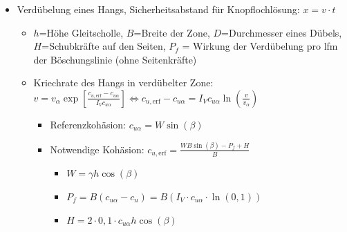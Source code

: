 \documentclass[fleqn,twoside]{article}
\begin{document}
\begin{itemize}
	\item Verdübelung eines Hangs, Sicherheitsabstand für Knopflochlösung: $x=v\cdot t$
	\begin{itemize}
		\item $h$=Höhe Gleitscholle, $B$=Breite der Zone, $D$=Durchmesser eines Dübels, $H$=Schubkräfte auf den Seiten, $P_f$ = Wirkung der Verdübelung pro lfm der Böschungslinie (ohne Seitenkräfte)
		\item Kriechrate des Hangs in verdübelter Zone: $v=v_\alpha \exp\left[\frac{c_{u,\text{erf}}-c_{u\alpha}}{I_V c_{u\alpha}}\right] \Leftrightarrow c_{u,\text{erf}} - c_{u\alpha} = I_V c_{u\alpha} \ln\left(\frac{v}{v_\alpha}\right)$
		\begin{itemize}
			\item Referenzkohäsion: $c_{u\alpha}=W\sin(\beta)$
			\item Notwendige Kohäsion: $c_{u,\text{erf}}=\frac{WB\sin(\beta)-P_f+H}{B}$
			\begin{itemize}
				\item $W=\gamma h \cos(\beta)$
				\item $P_f=B(c_{u\alpha}-c_u)=B(I_V \cdot c_{u\alpha} \cdot \ln(0,1))$
				\item $H=2 \cdot 0,1 \cdot c_{u\alpha} h \cos(\beta)$
			\end{itemize}
		\end{itemize}
	\end{itemize}
		

\end{itemize}
\end{document}
